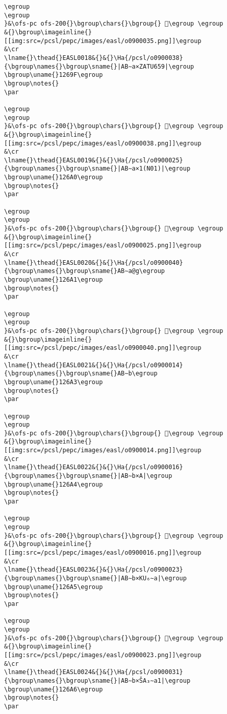 \begin{verbatim}
\egroup
\egroup
}&\ofs-pc ofs-200{}\bgroup\chars{}\bgroup{} 𒚞\egroup \egroup
&{}\bgroup\imageinline{}[[img:src=/pcsl/pepc/images/easl/o0900035.png]]\egroup
&\cr
\lname{}\thead{}EASL0018&{}&{}\Ha{/pcsl/o0900038}{\bgroup\names{}\bgroup\sname{}|AB∼a×ZATU659|\egroup
\bgroup\uname{}1269F\egroup
\bgroup\notes{}
\par 

\egroup
\egroup
}&\ofs-pc ofs-200{}\bgroup\chars{}\bgroup{} 𒚟\egroup \egroup
&{}\bgroup\imageinline{}[[img:src=/pcsl/pepc/images/easl/o0900038.png]]\egroup
&\cr
\lname{}\thead{}EASL0019&{}&{}\Ha{/pcsl/o0900025}{\bgroup\names{}\bgroup\sname{}|AB∼a×1(N01)|\egroup
\bgroup\uname{}126A0\egroup
\bgroup\notes{}
\par 

\egroup
\egroup
}&\ofs-pc ofs-200{}\bgroup\chars{}\bgroup{} 𒚠\egroup \egroup
&{}\bgroup\imageinline{}[[img:src=/pcsl/pepc/images/easl/o0900025.png]]\egroup
&\cr
\lname{}\thead{}EASL0020&{}&{}\Ha{/pcsl/o0900040}{\bgroup\names{}\bgroup\sname{}AB∼a@g\egroup
\bgroup\uname{}126A1\egroup
\bgroup\notes{}
\par 

\egroup
\egroup
}&\ofs-pc ofs-200{}\bgroup\chars{}\bgroup{} 𒚡\egroup \egroup
&{}\bgroup\imageinline{}[[img:src=/pcsl/pepc/images/easl/o0900040.png]]\egroup
&\cr
\lname{}\thead{}EASL0021&{}&{}\Ha{/pcsl/o0900014}{\bgroup\names{}\bgroup\sname{}AB∼b\egroup
\bgroup\uname{}126A3\egroup
\bgroup\notes{}
\par 

\egroup
\egroup
}&\ofs-pc ofs-200{}\bgroup\chars{}\bgroup{} 𒚣\egroup \egroup
&{}\bgroup\imageinline{}[[img:src=/pcsl/pepc/images/easl/o0900014.png]]\egroup
&\cr
\lname{}\thead{}EASL0022&{}&{}\Ha{/pcsl/o0900016}{\bgroup\names{}\bgroup\sname{}|AB∼b×A|\egroup
\bgroup\uname{}126A4\egroup
\bgroup\notes{}
\par 

\egroup
\egroup
}&\ofs-pc ofs-200{}\bgroup\chars{}\bgroup{} 𒚤\egroup \egroup
&{}\bgroup\imageinline{}[[img:src=/pcsl/pepc/images/easl/o0900016.png]]\egroup
&\cr
\lname{}\thead{}EASL0023&{}&{}\Ha{/pcsl/o0900023}{\bgroup\names{}\bgroup\sname{}|AB∼b×KU₆∼a|\egroup
\bgroup\uname{}126A5\egroup
\bgroup\notes{}
\par 

\egroup
\egroup
}&\ofs-pc ofs-200{}\bgroup\chars{}\bgroup{} 𒚥\egroup \egroup
&{}\bgroup\imageinline{}[[img:src=/pcsl/pepc/images/easl/o0900023.png]]\egroup
&\cr
\lname{}\thead{}EASL0024&{}&{}\Ha{/pcsl/o0900031}{\bgroup\names{}\bgroup\sname{}|AB∼b×ŠA₃∼a1|\egroup
\bgroup\uname{}126A6\egroup
\bgroup\notes{}
\par 


\end{verbatim}

